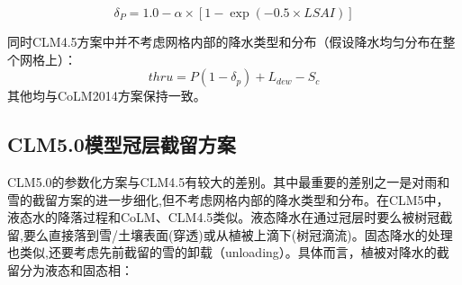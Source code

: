 \begin{equation}
\delta_{P}=1.0-\alpha \times\left[1-\exp \left(-0.5 \times LSAI\right)\right]
\end{equation}

同时CLM4.5方案中并不考虑网格内部的降水类型和分布（假设降水均匀分布在整个网格上）：
\begin{equation}
thru=P\left(1-\delta_{p}\right)+L_{dew}-S_{c}
\end{equation}
其他均与CoLM2014方案保持一致。

\subsection{CLM5.0模型冠层截留方案}
CLM5.0的参数化方案与CLM4.5有较大的差别。其中最重要的差别之一是对雨和雪的截留方案的进一步细化,但不考虑网格内部的降水类型和分布。在CLM5中，液态水的降落过程和CoLM、CLM4.5类似。液态降水在通过冠层时要么被树冠截留,要么直接落到雪/土壤表面(穿透)或从植被上滴下(树冠滴流)。固态降水的处理也类似,还要考虑先前截留的雪的卸载（unloading）。具体而言，植被对降水的截留分为液态和固态相：
